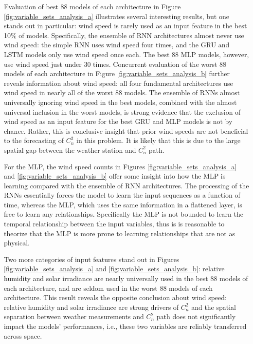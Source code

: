 Evaluation of best 88 models of each architecture in Figure \ref{fig:variable_sets_analysis_a} illustrates several interesting results, but one stands out in particular: wind speed is rarely used as an input feature in the best 10\% of models. Specifically, the ensemble of RNN architectures almost never use wind speed: the simple RNN uses wind speed four times, and the GRU and LSTM models only use wind speed once each. The best 88 MLP models, however, use wind speed just under 30 times. Concurrent evaluation of the worst 88 models of each architecture in Figure \ref{fig:variable_sets_analysis_b} further reveals information about wind speed: all four fundamental architectures use wind speed in nearly all of the worst 88 models. The ensemble of RNNs almost universally ignoring wind speed in the best models, combined with the almost universal inclusion in the worst models, is strong evidence that the exclusion of wind speed as an input feature for the best GRU and MLP models is not by chance. Rather, this is conclusive insight that prior wind speeds are not beneficial to the forecasting of $C_{n}^{2}$ in this problem. It is likely that this is due to the large spatial gap between the weather station and $C_{n}^{2}$ path. 

For the MLP, the wind speed counts in Figures \ref{fig:variable_sets_analysis_a} and \ref{fig:variable_sets_analysis_b} offer some insight into how the MLP is learning compared with the ensemble of RNN architectures. The processing of the RNNs essentially forces the model to learn the input sequences as a function of time, whereas the MLP, which uses the same information in a flattened layer, is free to learn any relationships. Specifically the MLP is not bounded to learn the temporal relationship between the input variables, thus is is reasonable to theorize that the MLP is more prone to learning relationships that are not as physical.

Two more categories of input features stand out in Figures \ref{fig:variable_sets_analysis_a} and \ref{fig:variable_sets_analysis_b}: relative humidity and solar irradiance are nearly universally used in the best 88 models of each architecture, and are seldom used in the worst 88 models of each architecture. This result reveals the opposite conclusion about wind speed: relative humidity and solar irradiance are strong drivers of $C_{n}^{2}$ and the spatial separation between weather measurements and $C_{n}^{2}$ path does not significantly impact the models' performances, i.e., these two variables are reliably transferred across space.

